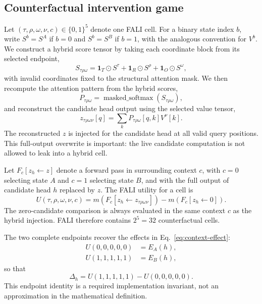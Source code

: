 \documentclass[pdflatex,sn-mathphys-ay]{sn-jnl}
\begin{document}
\subsection{Counterfactual intervention game}\label{sec:game}

Let $(\tau,\rho,\omega,\nu,c)\in\{0,1\}^{5}$ denote one FALI cell. For a binary state index $b$, write $S^{b}=S^{A}$ if $b=0$ and $S^{b}=S^{B}$ if $b=1$, with the analogous convention for $V^{b}$. We construct a hybrid score tensor by taking each coordinate block from its selected endpoint,
\begin{equation}
S_{\tau\rho\omega}
=
\mathbf{1}_{T}\odot S^{\tau}
+\mathbf{1}_{R}\odot S^{\rho}
+\mathbf{1}_{O}\odot S^{\omega},
\label{eq:hybrid-scores}
\end{equation}
with invalid coordinates fixed to the structural attention mask. We then recompute the attention pattern from the hybrid scores,
\begin{equation}
P_{\tau\rho\omega}
=\operatorname{masked\_softmax}(S_{\tau\rho\omega}),
\label{eq:hybrid-pattern}
\end{equation}
and reconstruct the candidate head output using the selected value tensor,
\begin{equation}
z_{\tau\rho\omega\nu}[q]
=\sum_{k}P_{\tau\rho\omega}[q,k]V^{\nu}[k].
\label{eq:hybrid-z}
\end{equation}
The reconstructed $z$ is injected for the candidate head at all valid query positions. This full-output overwrite is important: the live candidate computation is not allowed to leak into a hybrid cell.

Let $F_c[z_h\leftarrow z]$ denote a forward pass in surrounding context $c$, with $c=0$ selecting state $A$ and $c=1$ selecting state $B$, and with the full output of candidate head $h$ replaced by $z$. The FALI utility for a cell is
\begin{equation}
U(\tau,\rho,\omega,\nu,c)
=
 m\!\left(F_c[z_h\leftarrow z_{\tau\rho\omega\nu}]\right)
-
 m\!\left(F_c[z_h\leftarrow 0]\right).
\label{eq:fali-utility}
\end{equation}
The zero-candidate comparison is always evaluated in the same context $c$ as the hybrid injection. FALI therefore contains $2^5=32$ counterfactual cells.

The two complete endpoints recover the effects in Eq.~\ref{eq:context-effect}:
\begin{align}
U(0,0,0,0,0) &= E_A(h), \\
U(1,1,1,1,1) &= E_B(h),
\end{align}
so that
\begin{equation}
\Delta_h
=U(1,1,1,1,1)-U(0,0,0,0,0).
\label{eq:fali-endpoint-identity}
\end{equation}
This endpoint identity is a required implementation invariant, not an approximation in the mathematical definition.
\end{document}

